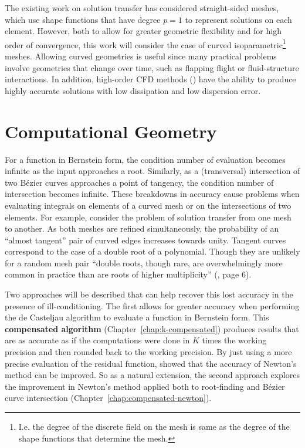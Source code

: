 The existing work on solution transfer has considered straight-sided meshes,
which use shape functions that have degree \(p = 1\) to represent solutions
on each element. However, both to allow for greater geometric flexibility
and for high order of convergence, this work will consider the case
of curved isoparametric\footnote{I.e. the degree of the discrete field on the
mesh is same as the degree of the shape functions that determine the
mesh.} meshes. Allowing curved geometries is useful since many practical
problems involve geometries that change over time, such as flapping flight
or fluid-structure interactions. In addition, high-order CFD methods
(\cite{Wang2013}) have the ability to produce highly accurate solutions
with low dissipation and low dispersion error.

\section{Computational Geometry}

For a function in Bernstein form, the condition number of evaluation
becomes infinite as the input approaches a root. Similarly,
as a (transversal) intersection of two B\'{e}zier curves approaches a
point of tangency, the condition number of intersection becomes
infinite. These breakdowns in accuracy cause problems when evaluating
integrals on elements of a curved mesh or on the intersections of two
elements. For example, consider the problem of solution transfer from
one mesh to another. As both meshes are refined simultaneously, the
probability of an ``almost tangent'' pair of curved edges increases
towards unity. Tangent curves correspond to the case of a double root
of a polynomial. Though they are unlikely for a random mesh pair
``double roots, though rare, are overwhelmingly more common in practice
than are roots of higher multiplicity'' (\cite{Kahan1972}, page 6).

Two approaches will be described that can help recover this lost accuracy
in the presence of ill-conditioning. The first allows for greater
accuracy when performing the de Casteljau algorithm to evaluate
a function in Bernstein form. This \textbf{compensated algorithm}
(Chapter~\ref{chap:k-compensated}) produces results that are as accurate as if
the computations were done in \(K\) times the working precision
and then rounded back to the working precision. By just using a
more precise evaluation of the residual function,
\cite{Tisseur2001} showed that the accuracy of Newton's method can
be improved. So as a natural extension, the second approach
explores the improvement in Newton's method applied both to
root-finding and B\'{e}zier curve intersection
(Chapter~\ref{chap:compensated-newton}).

